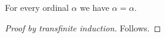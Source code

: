 

\begin{proposition}\label{phase5_actual_ordinal_transfinite_induction}
    For every ordinal $\alpha$ we have $\alpha=\alpha$.
\end{proposition}
\begin{proof}[Proof by transfinite induction]
    Follows.
\end{proof}
